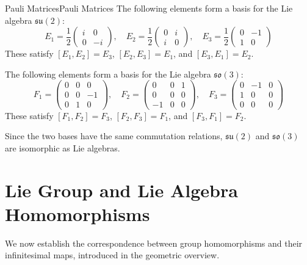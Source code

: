 \documentclass[../main.tex]{subfiles}
\begin{document}
\begin{example}{Pauli Matrices}{Pauli Matrices}
  The following elements form a basis for the Lie algebra $\mathfrak{su}(2)$:
  \begin{equation}
    E_1 = \frac{1}{2} \begin{pmatrix}
      i & 0 \\
      0 & -i
    \end{pmatrix},\quad
    E_2 = \frac{1}{2} \begin{pmatrix}
      0 & i \\
      i & 0
    \end{pmatrix},\quad
    E_3 = \frac{1}{2} \begin{pmatrix}
      0 & -1 \\
      1 & 0
    \end{pmatrix}
  \end{equation}
  These satisfy $[E_1, E_2] = E_3$, $[E_2, E_3] = E_1$, and $[E_3, E_1] = E_2$.

  The following elements form a basis for the Lie algebra $\mathfrak{so}(3)$:
  \begin{equation}
    F_1 = \begin{pmatrix}
      0 & 0 & 0 \\
      0 & 0 & -1 \\
      0 & 1 & 0
    \end{pmatrix},\quad
    F_2 = \begin{pmatrix}
      0 & 0 & 1 \\
      0 & 0 & 0 \\
      -1 & 0 & 0
    \end{pmatrix},\quad
    F_3 = \begin{pmatrix}
      0 & -1 & 0 \\
      1 & 0 & 0 \\
      0 & 0 & 0
    \end{pmatrix}
  \end{equation}
  These satisfy $[F_1, F_2] = F_3$, $[F_2, F_3] = F_1$, and $[F_3, F_1] = F_2$.

  Since the two bases have the same commutation relations, $\mathfrak{su}(2)$ and $\mathfrak{so}(3)$ are isomorphic as Lie algebras.
\end{example}

\section{Lie Group and Lie Algebra Homomorphisms}
We now establish the correspondence between group homomorphisms and their infinitesimal maps, introduced in the geometric overview.
\end{document}
